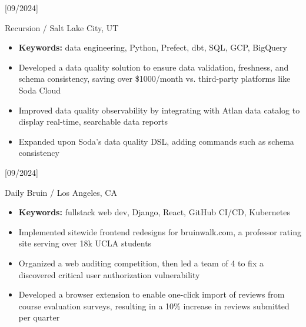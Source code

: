 \documentclass{article}
\begin{document}
[09/2024]

Recursion / Salt Lake City, UT

\begin{itemize}
  \item
  \textbf{Keywords:} data engineering, Python, Prefect, dbt, SQL, GCP, BigQuery

  \item
  Developed a data quality solution to ensure data validation, freshness, and
  schema consistency, saving over \$1000/month vs. third-party platforms like
  Soda Cloud

  \item
  Improved data quality observability by integrating with Atlan data catalog to
  display real-time, searchable data reports

  \item
  Expanded upon Soda's data quality DSL, adding commands such as schema
  consistency
\end{itemize}

[09/2024]

Daily Bruin / Los Angeles, CA

\begin{itemize}
  \item
  \textbf{Keywords:} fullstack web dev, Django, React, GitHub CI/CD, Kubernetes

  \item
  Implemented sitewide frontend redesigns for bruinwalk.com, a professor rating
  site serving over 18k UCLA students

  \item
  Organized a web auditing competition, then led a team of 4 to fix a discovered
  critical user authorization vulnerability

  \item
  Developed a browser extension to enable one-click import of reviews from
  course evaluation surveys, resulting in a 10\% increase in reviews submitted
  per quarter
\end{itemize}



\end{document}
